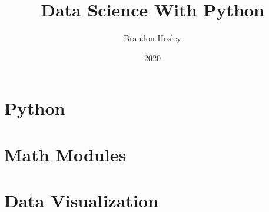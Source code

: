 \documentclass[a4paper,12pt]{book}
\author{Brandon Hosley}
\title{Data Science With Python}
\date{2020}
\begin{document}
\frontmatter
\maketitle
\tableofcontents

\mainmatter
\part{Python}


\part{Math Modules}

\part{Data Visualization}








\backmatter
\end{document}
